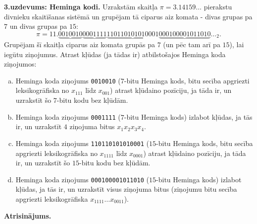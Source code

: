 \documentclass[11pt]{article}
\begin{document}
\vspace{10pt}
{\footnotesize
\noindent
{\bf 3.uzdevums: Heminga kodi.} 
Uzrakstām skaitļa $\pi = 3.14159\ldots$ pierakstu divnieku skaitīšanas sistēmā un 
grupējam tā ciparus aiz komata - divas grupas pa $7$ un divas grupas pa $15$:
$$\pi = 11.\underbrace{0010010}\underbrace{0001111}\underbrace{110110101010001}\underbrace{000100001011010}\ldots_2.$$
Grupējam šī skaitļa ciparus aiz komata grupās pa $7$ (un pēc tam arī pa
$15$), lai iegūtu ziņojumus. Atrast kļūdas (ja tādas ir) atbilstošajos Heminga koda ziņojumos:
\begin{enumerate}[(a)]
\item Heminga koda ziņojums {\tt 0010010} ($7$-bitu Heminga kods, bitu secība apgriezti leksikogrāfiska
\textendash{} no $x_{111}$ līdz $x_{001}$) \textendash{} atrast kļūdaino pozīciju, ja tāda ir, un uzrakstīt šo $7$-bitu kodu bez kļūdām.
\item Heminga koda ziņojums {\tt 0001111} ($7$-bitu Heminga kods) \textendash{} izlabot kļūdas, ja tās ir, un uzrakstīt $4$ ziņojuma bitus $x_1x_2x_3x_4$. 
\item Heminga koda ziņojums {\tt 110110101010001} ($15$-bitu Heminga kods, bitu secība apgriezti leksikogrāfiska 
\textendash{} no $x_{1111}$ līdz $x_{0001}$) \textendash{} atrast kļūdaino pozīciju, ja tāda ir, un uzrakstīt šo $15$-bitu kodu bez kļūdām.
\item Heminga koda ziņojums {\tt 000100001011010} ($15$-bitu Heminga kods) \textendash{} 
izlabot kļūdas, ja tās ir, un uzrakstīt visus ziņojuma bitus (ziņojumu bitu secība apgriezti leksikogrāfiska $x_{1111}\ldots{}x_{0011}$).
\end{enumerate}
}


\vspace{6pt}
{\bf Atrisinājums.} 
\end{document}
